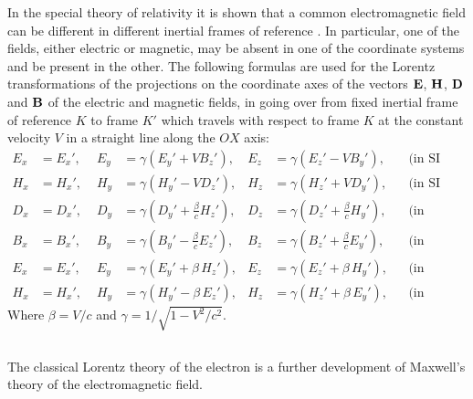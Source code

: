 In the special theory of relativity  it is shown that a common electromagnetic field can be different in different inertial frames of reference . In particular, one of the fields, either electric or magnetic, may be absent in one of the coordinate systems and be present in the other. The following formulas are used for the Lorentz transformations of the projections on the coordinate axes of the vectors $\vb{E}$, $\vb{H}$, $\vb{D}$ and $\vb{B}$ of the electric and magnetic fields, in going over from fixed inertial frame of reference $K$ to frame $K'$ which travels with respect to frame $K$ at the constant velocity $V$ in a straight line along the $OX$ axis:
\begin{align*}%
E_{x}& = E_{x}',\,\, & E_{y} & = \gamma(E_{y}'+ VB_{z}'), & E_{z} & = \gamma(E_{z}'- VB_{y}'), && \text{(in SI units),} \\
H_{x}& = H_{x}',\,\, & H_{y} & = \gamma(H_{y}' - VD_{z}'), & H_{z} & = \gamma(H_{z}'+ VD_{y}'), && \text{(in SI units),} \\
D_{x}& = D_{x}',\,\, & D_{y} & = \gamma \left(D_{y}' + \frac{\beta}{c}H_{z}' \right), & D_{z} & = \gamma \left(D_{z}' + \frac{\beta}{c}H_{y}' \right), && \text{(in Gaussian units),} \\
B_{x}& = B_{x}',\,\, & B_{y} & = \gamma \left(B_{y}' - \frac{\beta}{c}E_{z}' \right), & B_{z} & = \gamma \left(B_{z}' + \frac{\beta}{c}E_{y}' \right), && \text{(in Gaussian units),} \\
E_{x}& = E_{x}',\,\, & E_{y} & = \gamma \left(E_{y}' + \beta \, H_{z}' \right), & E_{z} & = \gamma \left(E_{z}' + \beta \, H_{y}' \right), && \text{(in Gaussian units),} \\
H_{x}& = H_{x}',\,\, & H_{y} & = \gamma \left(H_{y}' - \beta \, E_{z}' \right), & H_{z} & = \gamma \left(H_{z}' + \beta \, E_{y}' \right), && \text{(in Gaussian units).}
\end{align*}
Where $\beta = V/c$ and $\gamma = 1/\sqrt{1 - V^{2}/c^{2}}$.

\subsection{}\label{27.4.6} The classical Lorentz theory of the electron is a further development of Maxwell's theory of the electromagnetic field.

